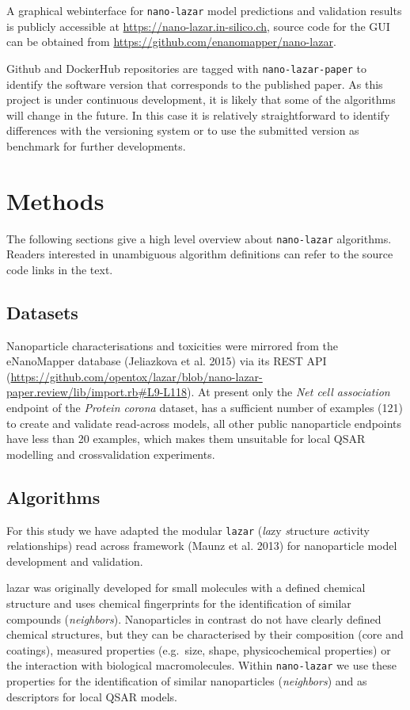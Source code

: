 \documentclass[utf8]{frontiersHLTH} %
\begin{document}
A graphical webinterface for \texttt{nano-lazar} model predictions and
validation results is publicly accessible at
\url{https://nano-lazar.in-silico.ch}, source code for the GUI can be
obtained from \url{https://github.com/enanomapper/nano-lazar}.

Github and DockerHub repositories are tagged with
\texttt{nano-lazar-paper} to identify the software version that
corresponds to the published paper. As this project is under continuous
development, it is likely that some of the algorithms will change in the
future. In this case it is relatively straightforward to identify
differences with the versioning system or to use the submitted version
as benchmark for further developments.

\section{Methods}\label{methods}

The following sections give a high level overview about
\texttt{nano-lazar} algorithms. Readers interested in unambiguous
algorithm definitions can refer to the source code links in the text.

\subsection{Datasets}\label{datasets}

Nanoparticle characterisations and toxicities were mirrored from the
eNanoMapper database (Jeliazkova et al. 2015) via its REST API
(\url{https://github.com/opentox/lazar/blob/nano-lazar-paper.review/lib/import.rb\#L9-L118}).
At present only the \emph{Net cell association} endpoint of the
\emph{Protein corona} dataset, has a sufficient number of examples (121)
to create and validate read-across models, all other public nanoparticle
endpoints have less than 20 examples, which makes them unsuitable for
local QSAR modelling and crossvalidation experiments.

\subsection{Algorithms}\label{algorithms}

For this study we have adapted the modular \texttt{lazar} (\emph{la}zy
\emph{s}tructure \emph{a}ctivity \emph{r}elationships) read across
framework (Maunz et al. 2013) for nanoparticle model development and
validation.

lazar was originally developed for small molecules with a defined
chemical structure and uses chemical fingerprints for the identification
of similar compounds (\emph{neighbors}). Nanoparticles in contrast do
not have clearly defined chemical structures, but they can be
characterised by their composition (core and coatings), measured
properties (e.g.~size, shape, physicochemical properties) or the
interaction with biological macromolecules. Within \texttt{nano-lazar}
we use these properties for the identification of similar nanoparticles
(\emph{neighbors}) and as descriptors for local QSAR models.
\end{document}
